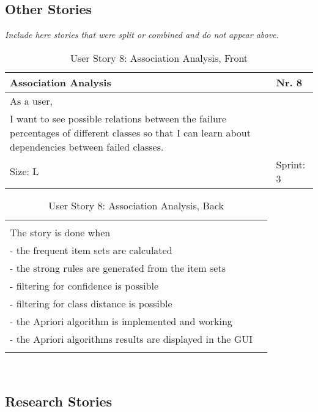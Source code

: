 \subsection*{Other Stories}
\emph{Include here stories that were split or combined and do not appear above.}

\begin{table}[H]
  \caption{User Story 8: Association Analysis, Front}
  \label{Story_8_Front}
  \centering
  \begin{tabular}{|p{9cm} p{2cm}|}
	\hline  	
  	Association Analysis & Nr. 8 \\ 
  	\hline
  	As a user, &    \\ 
  	I want to see possible relations between the failure percentages of different classes so that I can learn about dependencies between failed classes. &    \\ 
  	Size: L & Sprint: 3 \\ 
  	\hline
  \end{tabular}
\end{table}
\begin{table}[H]
  \caption{User Story 8: Association Analysis, Back}
  \label{Story_8_Back}
  \centering
  \begin{tabular}{|p{10cm} p{1cm}|}
  \hline
  	  &    \\ 
  	The story is done when &    \\ 
  	 - the frequent item sets are calculated & \\ 
  	 - the strong rules are generated from the item sets & \\ 
  	 - filtering for confidence is possible & \\ 
  	 - filtering for class distance is possible & \\ 
  	 - the Apriori algorithm is implemented and working & \\ 
  	 - the Apriori algorithms results are displayed in the GUI & \\ 
  	 
  	  &  
  	   \\ 
  	\hline
  \end{tabular}
\end{table} 

\ \\ 

\subsection*{Research Stories} 

